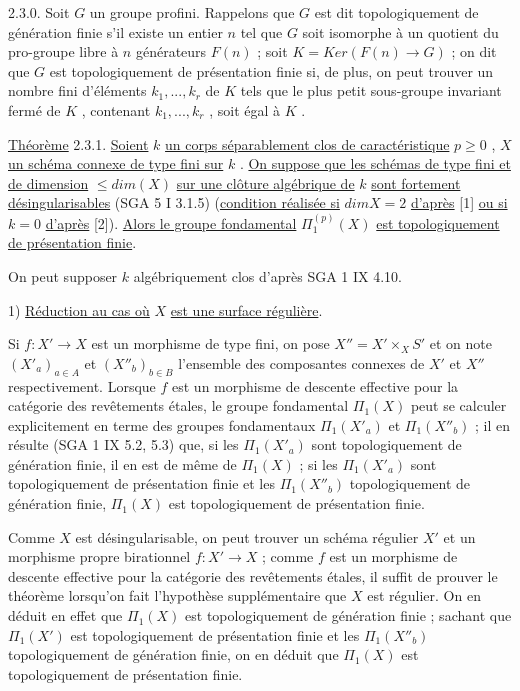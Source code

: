 2.3.0. Soit $G$ un groupe profini. Rappelons que $G$ est dit topologiquement de génération finie s'il existe un entier $n$ tel que $G$ soit isomorphe à un quotient du pro-groupe libre à $n$ générateurs $F(n)$ ; soit $K = Ker(F(n) \longrightarrow G)$ ; on dit que $G$ est topologiquement de présentation finie si, de plus, on peut trouver un nombre fini d'éléments $k_1,...,k_r$ de $K$ tels que le plus petit sous-groupe invariant fermé de $K$ , contenant $k_1,...,k_r$ , soit égal à $K$ .

\underline{Théorème} 2.3.1. \underline{Soient} $k$ \underline{un corps séparablement clos de caractéristique} $p \geqslant 0$ , $X$ \underline{un schéma connexe de type fini sur} $k$ . \underline{On suppose que les schémas de type fini et de dimension} $\leqslant dim(X)$ \underline{sur une clôture algébrique de} $k$ \underline{sont fortement désingularisables} (SGA 5 I 3.1.5) (\underline{condition réalisée si} $dim X = 2$ \underline{d'après} [1] \underline{ou si} $k = 0$ \underline{d'après} [2]). \underline{Alors le groupe fondamental} $\Pi_1^{(p)}(X)$ \underline{est topologiquement de présentation finie}.

On peut supposer $k$ algébriquement clos d'après SGA 1 IX 4.10.


1) \underline{Réduction au cas où} $X$ \underline{est une surface régulière}.

Si $f : X' \longrightarrow X$ est un morphisme de type fini, on pose $X'' = X'\times_X S'$ et on note $(X'_a)_{a \in A}$ et $(X''_b)_{b \in B}$ l'ensemble des composantes connexes de $X'$ et $X''$ respectivement. Lorsque $f$ est un morphisme de descente effective pour la catégorie des revêtements étales, le groupe fondamental $\Pi_1(X)$ peut se calculer explicitement
en terme des groupes fondamentaux $\Pi_1(X'_a)$ et $\Pi_1(X''_b)$ ; il en résulte (SGA 1 IX 5.2, 5.3) que, si les $\Pi_1(X'_a)$ sont topologiquement de génération finie, il en est de même de $\Pi_1(X)$ ; si les $\Pi_1(X'_a)$ sont topologiquement de présentation finie et les $\Pi_1(X''_b)$ topologiquement de génération finie, $\Pi_1(X)$ est topologiquement de présentation finie.

Comme $X$ est désingularisable, on peut trouver un schéma régulier $X'$ et un morphisme propre birationnel $f : X' \longrightarrow X$ ; comme $f$ est un morphisme de descente effective pour la catégorie des revêtements étales, il suffit de prouver le théorème lorsqu'on fait l'hypothèse supplémentaire que $X$ est régulier. On en déduit en effet que $\Pi_1(X)$ est topologiquement de génération finie ; sachant que $\Pi_1(X')$ est topologiquement de présentation finie et les $\Pi_1(X''_b)$ topologiquement de génération finie, on en déduit que $\Pi_1(X)$ est topologiquement de présentation finie.

